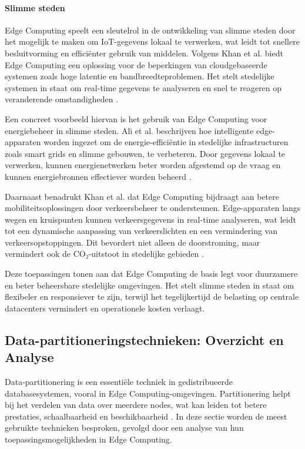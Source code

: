 \paragraph{Slimme steden}  
Edge Computing speelt een sleutelrol in de ontwikkeling van slimme steden door het mogelijk te maken om IoT-gegevens lokaal te verwerken, wat leidt tot snellere besluitvorming en efficiënter gebruik van middelen. Volgens Khan et al. biedt Edge Computing een oplossing voor de beperkingen van cloudgebaseerde systemen zoals hoge latentie en bandbreedteproblemen. Het stelt stedelijke systemen in staat om real-time gegevens te analyseren en snel te reageren op veranderende omstandigheden \autocite{EdgeSmartCities2023}.
 
Een concreet voorbeeld hiervan is het gebruik van Edge Computing voor energiebeheer in slimme steden. Ali et al. beschrijven hoe intelligente edge-apparaten worden ingezet om de energie-efficiëntie in stedelijke infrastructuren zoals smart grids en slimme gebouwen, te verbeteren. Door gegevens lokaal te verwerken, kunnen energienetwerken beter worden afgestemd op de vraag en kunnen energiebronnen effectiever worden beheerd \autocite{EnergyManagement2023}.
 
Daarnaast benadrukt Khan et al. dat Edge Computing bijdraagt aan betere mobiliteitsoplossingen door verkeersbeheer te ondersteunen. Edge-apparaten langs wegen en kruispunten kunnen verkeersgegevens in real-time analyseren, wat leidt tot een dynamische aanpassing van verkeerslichten en een vermindering van verkeersopstoppingen. Dit bevordert niet alleen de doorstroming, maar vermindert ook de CO₂-uitstoot in stedelijke gebieden \autocite{EdgeSmartCities2023}.
 
Deze toepassingen tonen aan dat Edge Computing de basis legt voor duurzamere en beter beheersbare stedelijke omgevingen. Het stelt slimme steden in staat om flexibeler en responsiever te zijn, terwijl het tegelijkertijd de belasting op centrale datacenters vermindert en operationele kosten verlaagt.
 
\subsection{Data-partitioneringstechnieken: Overzicht en Analyse}

Data-partitionering is een essentiële techniek in gedistribueerde databasesystemen, vooral in Edge Computing-omgevingen. Partitionering helpt bij het verdelen van data over meerdere nodes, wat kan leiden tot betere prestaties, schaalbaarheid en beschikbaarheid \autocite{Karger1997}.
In deze sectie worden de meest gebruikte technieken besproken, gevolgd door een analyse van hun toepassingsmogelijkheden in Edge Computing.

